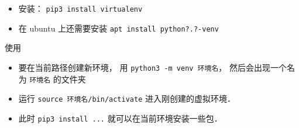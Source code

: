 
\begin{issues}
\issueDraft
\end{issues}

\begin{itemize}
\item 安装： \verb|pip3 install virtualenv|
\item 在 ubuntu 上还需要安装 \verb|apt install python?.?-venv|
\end{itemize}


使用
\begin{itemize}
\item 要在当前路径创建新环境， 用 \verb|python3 -m venv 环境名|， 然后会出现一个名为 \verb|环境名| 的文件夹
\item 运行 \verb|source 环境名/bin/activate| 进入刚创建的虚拟环境．
\item 此时 \verb|pip3 install ...| 就可以在当前环境安装一些包．
\end{itemize}
